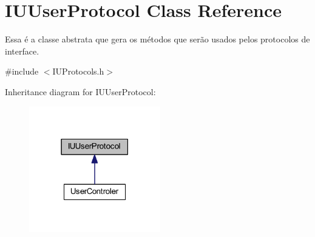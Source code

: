 \hypertarget{class_i_u_user_protocol}{\section{I\-U\-User\-Protocol Class Reference}
\label{class_i_u_user_protocol}
}


Essa é a classe abstrata que gera os métodos que serão usados pelos protocolos de interface.  




{\ttfamily \#include $<$I\-U\-Protocols.\-h$>$}



Inheritance diagram for I\-U\-User\-Protocol\-:\nopagebreak
\begin{figure}[H]
\begin{center}
\leavevmode
\includegraphics[width=162pt]{class_i_u_user_protocol__inherit__graph}
\end{center}
\end{figure}
